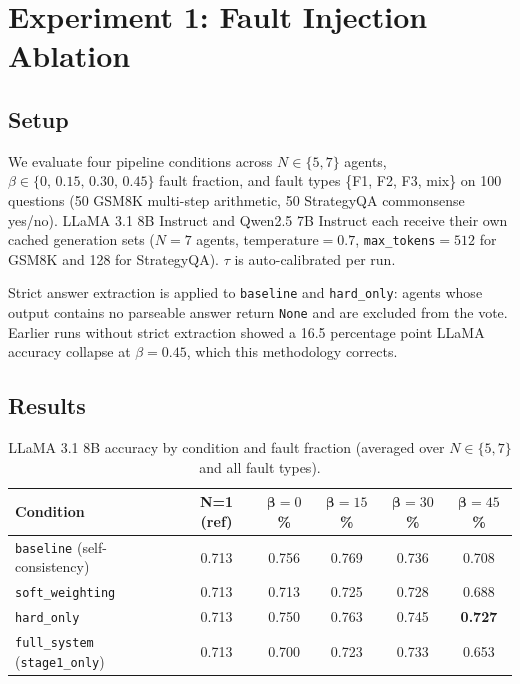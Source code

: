 \documentclass[11pt]{article}
\begin{document}
\section{Experiment 1: Fault Injection Ablation}
\label{sec:exp1}

\subsection{Setup}
\label{sec:exp1-setup}

We evaluate four pipeline conditions across $N \in \{5,7\}$ agents,
$\beta \in \{0,\,0.15,\,0.30,\,0.45\}$ fault fraction, and fault types
\{F1, F2, F3, mix\} on 100 questions (50 GSM8K multi-step arithmetic,
50 StrategyQA commonsense yes/no). LLaMA 3.1 8B Instruct \citep{metaai2024llama} and Qwen2.5 7B
Instruct \citep{qwenteam2024qwen25} each receive their own cached generation sets ($N=7$ agents,
temperature$=0.7$, \texttt{max\_tokens}$=512$ for GSM8K and 128 for
StrategyQA). $\tau$ is auto-calibrated per run.

Strict answer extraction is applied to \texttt{baseline} and \texttt{hard\_only}:
agents whose output contains no parseable answer return \texttt{None} and are
excluded from the vote. Earlier runs without strict extraction showed a 16.5
percentage point LLaMA accuracy collapse at $\beta=0.45$, which this methodology
corrects.

\subsection{Results}
\label{sec:exp1-results}

\begin{table}[h]
\centering
\caption{LLaMA 3.1 8B accuracy by condition and fault fraction (averaged over
  $N \in \{5,7\}$ and all fault types).}
\label{tab:exp1-llama}
\small
\begin{tabular}{lccccc}
\toprule
\textbf{Condition} & \textbf{N=1 (ref)} & $\bm{\beta}=0$\%
  & $\bm{\beta}=15$\% & $\bm{\beta}=30$\%
  & $\bm{\beta}=45$\% \\
\midrule
\texttt{baseline} (self-consistency) & 0.713 & 0.756 & 0.769 & 0.736 & 0.708 \\
\texttt{soft\_weighting}             & 0.713 & 0.713 & 0.725 & 0.728 & 0.688 \\
\texttt{hard\_only}                  & 0.713 & 0.750 & 0.763 & 0.745 & \textbf{0.727} \\
\texttt{full\_system} (\texttt{stage1\_only}) & 0.713 & 0.700 & 0.723 & 0.733 & 0.653 \\
\bottomrule
\end{tabular}
\end{table}
\end{document}
